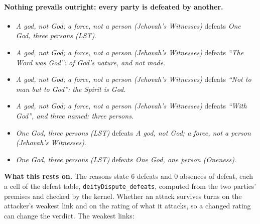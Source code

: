 \documentclass[11pt,paper=\testimonypaper,DIV=13,parskip=false]{scrartcl}
\begin{document}
\paragraph{Nothing prevails outright: every party is defeated by another.}
\begin{itemize}
\item \emph{A god, not God; a force, not a person (Jehovah’s Witnesses)} defeats \emph{One God, three persons (LST)}.
\item \emph{A god, not God; a force, not a person (Jehovah’s Witnesses)} defeats \emph{“The Word was God”: of God’s nature, and not made}.
\item \emph{A god, not God; a force, not a person (Jehovah’s Witnesses)} defeats \emph{“Not to man but to God”: the Spirit is God}.
\item \emph{A god, not God; a force, not a person (Jehovah’s Witnesses)} defeats \emph{“With God”, and three named: three persons}.
\item \emph{One God, three persons (LST)} defeats \emph{A god, not God; a force, not a person (Jehovah’s Witnesses)}.
\item \emph{One God, three persons (LST)} defeats \emph{One God, one person (Oneness)}.
\end{itemize}
\par\noindent\textbf{What this rests on.} The reasons state 6 defeats and 0 absences of defeat, each a cell of the defeat table, \texttt{deity\allowbreak{}Dispute\_\allowbreak{}defeats}, computed from the two parties' premises and checked by the kernel. Whether an attack survives turns on the attacker's weakest link and on the rating of what it attacks, so a changed rating can change the verdict. The weakest links:
\end{document}
